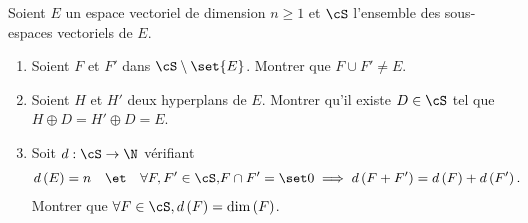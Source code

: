 \begin{enonce}
  \begin{exercise}[ID={RMS123 E823, Centrale PSI},subtitle={Centrale PSI},tags={mpsi},difficulty={2}]
  Soient $E$ un espace vectoriel de dimension $n\geq1$ et $\cS$ l'ensemble des sous-espaces vectoriels de $E$.
\begin{enumerate}
  \item Soient $F$ et $F'$ dans $\cS\setminus\set{E}$. Montrer que $F\cup F'\neq E$.
  \item Soient $H$ et $H'$ deux hyperplans de $E$.
    Montrer qu'il existe $D\in\cS$ tel que $H\oplus D = H'\oplus D = E$.
  \item Soit $d :\cS\to\N$ vérifiant
    \begin{align*}
    d\left( E \right) &=n&
    &\et&
    \forall F,F'\in\cS,& F\cap F'=\set0 \implies d\left( F+F' \right)=d\left( F \right)+d\left( F' \right).
    \end{align*}
    Montrer que $\forall F\in\cS, d\left( F \right)=\dim\left( F \right)$.
\end{enumerate}
\end{exercise}
\begin{solution}
\end{solution}
\end{enonce}
